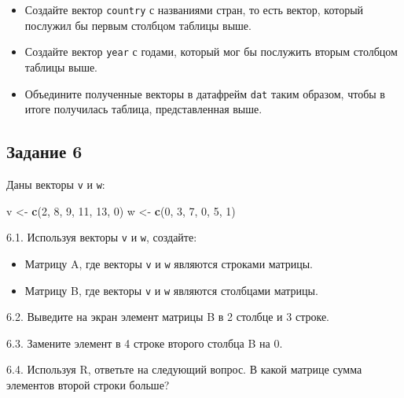 \documentclass[
]{article}
\newenvironment{Shaded}{\begin{snugshade}}{\end{snugshade}}
\newcommand{\DecValTok}[1]{\textcolor[rgb]{0.00,0.00,0.81}{#1}}
\newcommand{\KeywordTok}[1]{\textcolor[rgb]{0.13,0.29,0.53}{\textbf{#1}}}
\newcommand{\NormalTok}[1]{#1}
\newcommand{\StringTok}[1]{\textcolor[rgb]{0.31,0.60,0.02}{#1}}
\begin{document}
\begin{itemize}
\item
  Создайте вектор \texttt{country} с названиями стран, то есть вектор,
  который послужил бы первым столбцом таблицы выше.
\item
  Создайте вектор \texttt{year} с годами, который мог бы послужить
  вторым столбцом таблицы выше.
\item
  Объедините полученные векторы в датафрейм \texttt{dat} таким образом,
  чтобы в итоге получилась таблица, представленная выше.
\end{itemize}

\hypertarget{ux437ux430ux434ux430ux43dux438ux435-6}{%
\subsection{Задание 6}\label{ux437ux430ux434ux430ux43dux438ux435-6}}

Даны векторы \texttt{v} и \texttt{w}:

\begin{Shaded}
\begin{Highlighting}[]
\NormalTok{v <-}\StringTok{ }\KeywordTok{c}\NormalTok{(}\DecValTok{2}\NormalTok{, }\DecValTok{8}\NormalTok{, }\DecValTok{9}\NormalTok{, }\DecValTok{11}\NormalTok{, }\DecValTok{13}\NormalTok{, }\DecValTok{0}\NormalTok{)}
\NormalTok{w <-}\StringTok{ }\KeywordTok{c}\NormalTok{(}\DecValTok{0}\NormalTok{, }\DecValTok{3}\NormalTok{, }\DecValTok{7}\NormalTok{, }\DecValTok{0}\NormalTok{, }\DecValTok{5}\NormalTok{, }\DecValTok{1}\NormalTok{)}
\end{Highlighting}
\end{Shaded}

6.1. Используя векторы \texttt{v} и \texttt{w}, создайте:

\begin{itemize}
\item
  Матрицу A, где векторы \texttt{v} и \texttt{w} являются строками
  матрицы.
\item
  Матрицу B, где векторы \texttt{v} и \texttt{w} являются столбцами
  матрицы.
\end{itemize}

6.2. Выведите на экран элемент матрицы B в 2 столбце и 3 строке.

6.3. Замените элемент в 4 строке второго столбца B на 0.

6.4. Используя R, ответьте на следующий вопрос. В какой матрице сумма
элементов второй строки больше?
\end{document}
